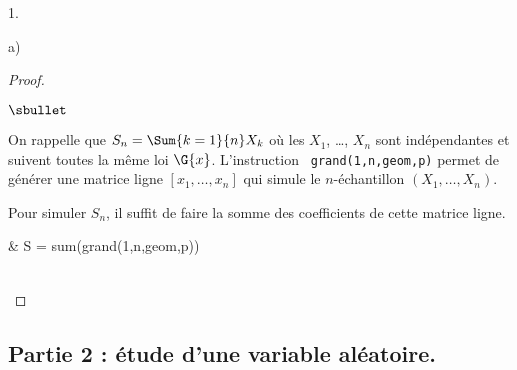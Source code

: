 \documentclass[11pt]{article}%
\begin{document}
\begin{noliste}{1.}
\begin{noliste}{a)}
    \begin{proof}~%
      \begin{noliste}{$\sbullet$}
      \item On rappelle que $S_n = \Sum{k=1}{n} X_k$ où les \var
        $X_1$, \ldots, $X_n$ sont indépendantes et suivent toutes la
        même loi $\G{x}$. L'instruction {\tt
          grand(1,n,\ttq{}geom\ttq{},p)} permet de générer une matrice
        ligne $[x_1, \ldots, x_n]$ qui simule le $n$-échantillon
        $(X_1, \ldots, X_n)$.
      \item Pour simuler $S_n$, il suffit de faire la somme des
        coefficients de cette matrice ligne.
        \begin{scilabC}{1}
          & S = sum(grand(1,n,\ttq{}geom\ttq{},p)) \nl %
        \end{scilabC}
      \end{noliste}
      ~\\[-1.4cm]
    \end{proof}
  \end{noliste}
\end{noliste}

\subsection*{Partie 2 : étude d'une variable aléatoire.}
\end{document}

